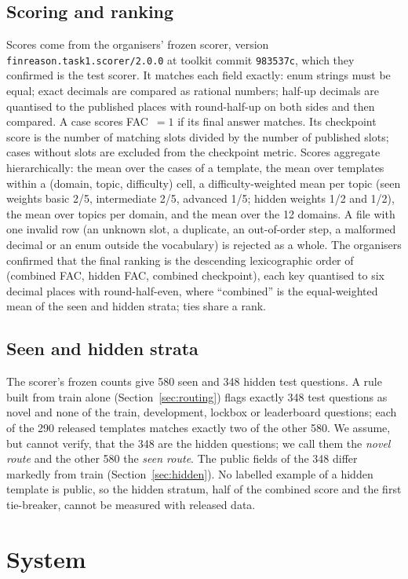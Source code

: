 \documentclass[conference]{IEEEtran}
\newcommand{\id}[1]{\texttt{#1}}
\begin{document}
\subsection{Scoring and ranking}
Scores come from the organisers' frozen scorer, version \id{finreason.task1.scorer/2.0.0} at toolkit commit \id{983537c}, which they confirmed is the test scorer. It matches each field exactly: enum strings must be equal; exact decimals are compared as rational numbers; half-up decimals are quantised to the published places with round-half-up on both sides and then compared. A case scores FAC~$=1$ if its final answer matches. Its checkpoint score is the number of matching slots divided by the number of published slots; cases without slots are excluded from the checkpoint metric. Scores aggregate hierarchically: the mean over the cases of a template, the mean over templates within a (domain, topic, difficulty) cell, a difficulty-weighted mean per topic (seen weights basic 2/5, intermediate 2/5, advanced 1/5; hidden weights 1/2 and 1/2), the mean over topics per domain, and the mean over the 12 domains. A file with one invalid row (an unknown slot, a duplicate, an out-of-order step, a malformed decimal or an enum outside the vocabulary) is rejected as a whole. The organisers confirmed that the final ranking is the descending lexicographic order of (combined FAC, hidden FAC, combined checkpoint), each key quantised to six decimal places with round-half-even, where ``combined'' is the equal-weighted mean of the seen and hidden strata; ties share a rank.

\subsection{Seen and hidden strata}\label{sec:strata}
The scorer's frozen counts give 580 seen and 348 hidden test questions. A rule built from train alone (Section~\ref{sec:routing}) flags exactly 348 test questions as novel and none of the train, development, lockbox or leaderboard questions; each of the 290 released templates matches exactly two of the other 580. We assume, but cannot verify, that the 348 are the hidden questions; we call them the \emph{novel route} and the other 580 the \emph{seen route}. The public fields of the 348 differ markedly from train (Section~\ref{sec:hidden}). No labelled example of a hidden template is public, so the hidden stratum, half of the combined score and the first tie-breaker, cannot be measured with released data.

\section{System}\label{sec:system}


\end{document}
